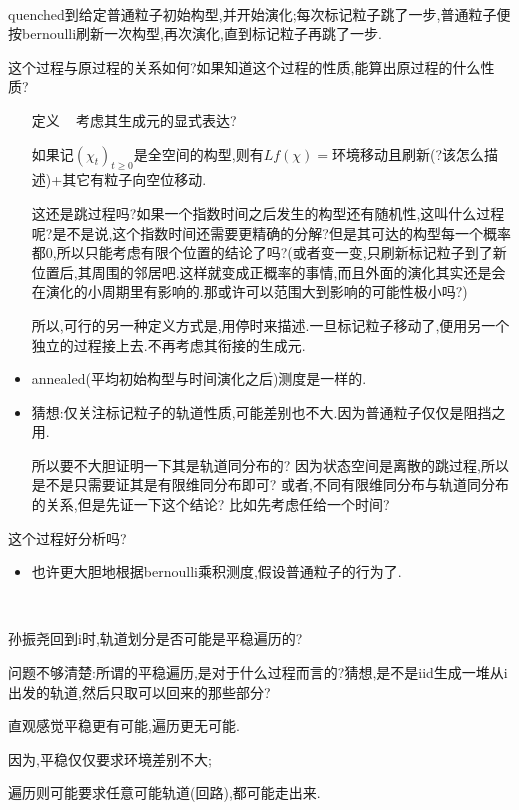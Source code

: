 \documentclass[a4paper,oneside]{ctexbook}
\begin{document}
					\begin{conjec}[刷新过程]
						\label{refresh}
						\ 

						quenched到给定普通粒子初始构型,并开始演化;每次标记粒子跳了一步,普通粒子便按bernoulli刷新一次构型,再次演化,直到标记粒子再跳了一步.

						这个过程与原过程的关系如何?如果知道这个过程的性质,能算出原过程的什么性质?

						\begin{itemize}
						\item[定义]~
						考虑其生成元的显式表达?

						如果记$(\chi_t)_{t \ge 0}$是全空间的构型,则有$Lf(\chi) =$环境移动且刷新(?该怎么描述)+其它有粒子向空位移动.

						这还是跳过程吗?如果一个指数时间之后发生的构型还有随机性,这叫什么过程呢?是不是说,这个指数时间还需要更精确的分解?但是其可达的构型每一个概率都0,所以只能考虑有限个位置的结论了吗?(或者变一变,只刷新标记粒子到了新位置后,其周围的邻居吧.这样就变成正概率的事情,而且外面的演化其实还是会在演化的小周期里有影响的.那或许可以范围大到影响的可能性极小吗?)

						所以,可行的另一种定义方式是,用停时来描述.一旦标记粒子移动了,便用另一个独立的过程接上去.不再考虑其衔接的生成元.
						\item annealed(平均初始构型与时间演化之后)测度是一样的.
						\item 猜想:仅关注标记粒子的轨道性质,可能差别也不大.因为普通粒子仅仅是阻挡之用.

						所以要不大胆证明一下其是轨道同分布的?
						因为状态空间是离散的跳过程,所以是不是只需要证其是有限维同分布即可?
						或者,不同有限维同分布与轨道同分布的关系,但是先证一下这个结论?
						比如先考虑任给一个时间?

						\end{itemize}

						这个过程好分析吗?
						\begin{itemize}
						\item 也许更大胆地根据bernoulli乘积测度,假设普通粒子的行为了.
						\end{itemize}

					\end{conjec}

					\begin{conjec}[轨道划分的角度来看]
						\label{pathcut}
						\ 

						孙振尧回到i时,轨道划分是否可能是平稳遍历的?

						问题不够清楚:所谓的平稳遍历,是对于什么过程而言的?猜想,是不是iid生成一堆从i出发的轨道,然后只取可以回来的那些部分?

						直观感觉平稳更有可能,遍历更无可能.

						因为,平稳仅仅要求环境差别不大;

						遍历则可能要求任意可能轨道(回路),都可能走出来.

					\end{conjec}
\end{document}
